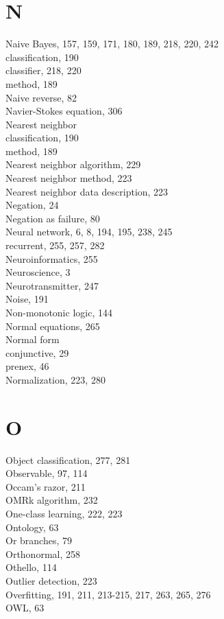 \documentclass[10pt]{book}
\begin{document}
\section*{N}
Naive Bayes, 157, 159, 171, 180, 189, 218, 220, 242\\
classification, 190\\
classifier, 218, 220\\
method, 189\\
Naive reverse, 82\\
Navier-Stokes equation, 306\\
Nearest neighbor\\
classification, 190\\
method, 189\\
Nearest neighbor algorithm, 229\\
Nearest neighbor method, 223\\
Nearest neighbor data description, 223\\
Negation, 24\\
Negation as failure, 80\\
Neural network, 6, 8, 194, 195, 238, 245\\
recurrent, 255, 257, 282\\
Neuroinformatics, 255\\
Neuroscience, 3\\
Neurotransmitter, 247\\
Noise, 191\\
Non-monotonic logic, 144\\
Normal equations, 265\\
Normal form\\
conjunctive, 29\\
prenex, 46\\
Normalization, 223, 280

\section*{O}
Object classification, 277, 281\\
Observable, 97, 114\\
Occam's razor, 211\\
OMRk algorithm, 232\\
One-class learning, 222, 223\\
Ontology, 63\\
Or branches, 79\\
Orthonormal, 258\\
Othello, 114\\
Outlier detection, 223\\
Overfitting, 191, 211, 213-215, 217, 263, 265, 276\\
OWL, 63
\end{document}
